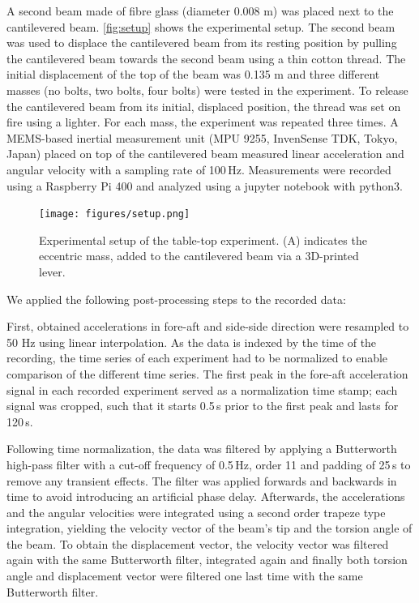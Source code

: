 \documentclass{article}
\begin{document}
A second beam made of fibre glass (diameter 0.008 m) was placed next to the cantilevered beam. \autoref{fig:setup} shows the experimental setup. The second beam was used to displace the cantilevered beam from its resting position by pulling the cantilevered beam towards the second beam using a thin cotton thread. The initial displacement of the top of the beam was 0.135 m and three different masses (no bolts, two bolts, four bolts) were tested in the experiment. To release the cantilevered beam from its initial, displaced position, the thread was set on fire using a lighter. For each mass, the experiment was repeated three times. A MEMS-based inertial measurement unit (MPU 9255, InvenSense TDK, Tokyo, Japan) placed on top of the cantilevered beam measured linear acceleration and angular velocity with a sampling rate of 100\,Hz. Measurements were recorded using a Raspberry Pi 400 and analyzed using a jupyter notebook with python3.

\begin{figure}[ht!]
    \centering
    \texttt{[image: figures/setup.png]}
    \caption{Experimental setup of the table-top experiment. (A) indicates the eccentric mass, added to the cantilevered beam via a 3D-printed lever.}
    \label{fig:setup}
\end{figure}

We applied the following post-processing steps to the recorded data:

First, obtained accelerations in fore-aft and side-side direction were resampled to 50 Hz using linear interpolation. As the data is indexed by the time of the recording, the time series of each experiment had to be normalized to enable comparison of the different time series. The first peak in the fore-aft acceleration signal in each recorded experiment served as a normalization time stamp; each signal was cropped, such that it starts 0.5\,s prior to the first peak and lasts for 120\,s. 

Following time normalization, the data was filtered by applying a Butterworth high-pass filter with a cut-off frequency of 0.5\,Hz, order 11 and padding of 25\,s to remove any transient effects. The filter was applied forwards and backwards in time to avoid introducing an artificial phase delay. Afterwards, the accelerations and the angular velocities were integrated using a second order trapeze type integration, yielding the velocity vector of the beam's tip and the torsion angle of the beam. To obtain the displacement vector, the velocity vector was filtered again with the same Butterworth filter, integrated again and finally both torsion angle and displacement vector were filtered one last time with the same Butterworth filter.
\end{document}
